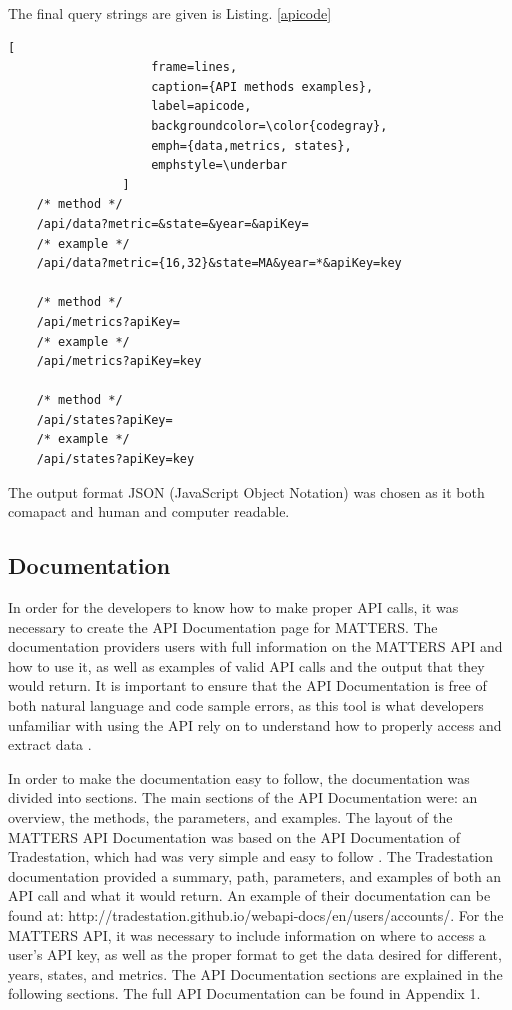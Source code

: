 				The final query strings are given is Listing. \ref{apicode}
				
				\begin{lstlisting}[
					frame=lines,
					caption={API methods examples}, 
					label=apicode, 
					backgroundcolor=\color{codegray}, 
					emph={data,metrics, states},
					emphstyle=\underbar
				]
	/* method */
	/api/data?metric=&state=&year=&apiKey=
	/* example */
	/api/data?metric={16,32}&state=MA&year=*&apiKey=key

	/* method */
	/api/metrics?apiKey=
	/* example */
	/api/metrics?apiKey=key

	/* method */
	/api/states?apiKey=
	/* example */
	/api/states?apiKey=key
				\end{lstlisting}
				
				The output format JSON (JavaScript Object Notation) was chosen
				as it both comapact and human and computer readable. 
				
			\subsection{Documentation}
				
				In order for the developers to know how to make proper API calls, 
				it was necessary to create the API Documentation page for MATTERS. 
				The documentation providers users with full information on the MATTERS API 
				and how to use it, as well as examples of valid API calls and the output 
				that they would return. It is important to ensure that the API Documentation 
				is free of both natural language and code sample errors, as this tool is 
				what developers unfamiliar with using the API rely on to understand how 
				to properly access and extract data \cite{errors}. 
				
				In order to make the documentation easy to follow, the documentation was divided into sections. 
				The main sections of the API Documentation were: an overview, the methods, 
				the parameters, and examples. The layout of the MATTERS API Documentation was based on the 
				API Documentation of Tradestation, which had was very simple and easy to follow \cite{apiex}. 
				The Tradestation documentation provided a summary, path, parameters, and examples of both an 
				API call and what it would return. An example of their documentation can be found at: 
				http://tradestation.github.io/webapi-docs/en/users/accounts/. For the MATTERS API, 
				it was necessary to include information on where to access a user's API key, 
				as well as the proper format to get the data desired for different, years, states, 
				and metrics. The API Documentation sections are explained in the following sections. 
				The full API Documentation can be found in Appendix 1.
				
